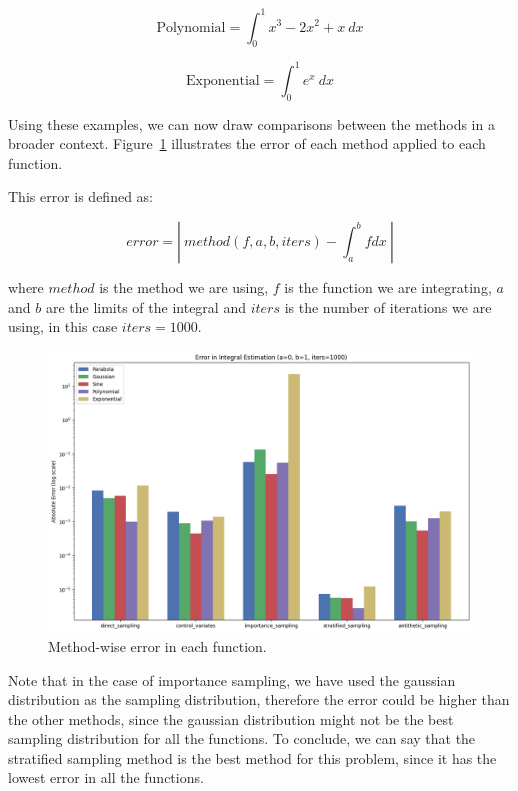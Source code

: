 \documentclass{report}
\begin{document}
\begin{equation} 
	\label{eq:integralvariancereduction4} 
	\text{Polynomial} = \int_{0}^{1} x^3 - 2x^2 + x \ dx
\end{equation}

\begin{equation} 
	\label{eq:integralvariancereduction5} 
	\text{Exponential} = \int_{0}^{1} e^x \ dx
\end{equation}

Using these examples, we can now draw comparisons between the methods in a broader context. Figure~\ref{fig:comparisonvariancereduction2} illustrates the error of each method applied to each function.

This error is defined as:

\begin{equation*} error = | \ method(f, a, b, iters) - \int_a^b{f dx} \ | \end{equation*}

where \(method\) is the method we are using, \(f\) is the function we are integrating, \(a\) and \(b\) are the limits of the integral and \(iters\) is the number of iterations we are using, in this case \(iters = 1000\).

\begin{figure}[H]
\centering
\includegraphics[width=0.8\linewidth]{./Figures/VarianceReduction/comparison2.png}
\caption{Method-wise error in each function.}
\label{fig:comparisonvariancereduction2}
\end{figure}

Note that in the case of importance sampling, we have used the gaussian distribution as the sampling distribution, therefore the error could be higher than the other methods, since the gaussian distribution might not be the best sampling distribution for all the functions. To conclude, we can say that the stratified sampling method is the best method for this problem, since it has the lowest error in all the functions. 
\end{document}
